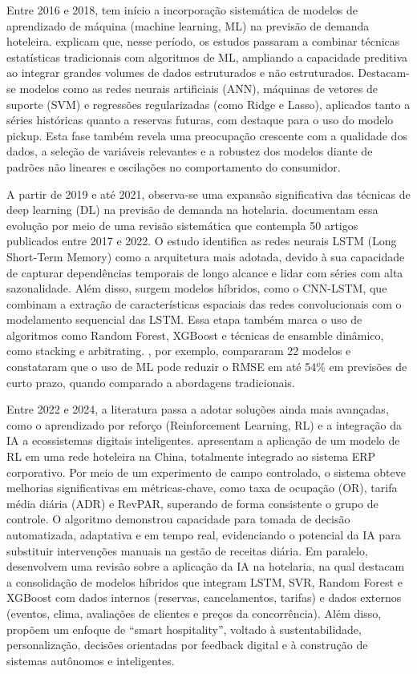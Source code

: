 Entre 2016 e 2018, tem início a incorporação sistemática de modelos de aprendizado de máquina (machine learning, ML) na previsão de demanda hoteleira. \citep{henriques2024hotel} explicam que, nesse período, os estudos passaram a combinar técnicas estatísticas tradicionais com algoritmos de ML, ampliando a capacidade preditiva ao integrar grandes volumes de dados estruturados e não estruturados. Destacam-se modelos como as redes neurais artificiais (ANN), máquinas de vetores de suporte (SVM) e regressões regularizadas (como Ridge e Lasso), aplicados tanto a séries históricas quanto a reservas futuras, com destaque para o uso do modelo pickup. Esta fase também revela uma preocupação crescente com a qualidade dos dados, a seleção de variáveis relevantes e a robustez dos modelos diante de padrões não lineares e oscilações no comportamento do consumidor.

A partir de 2019 e até 2021, observa-se uma expansão significativa das técnicas de deep learning (DL) na previsão de demanda na hotelaria. \citep{dowlut2023forecasting} documentam essa evolução por meio de uma revisão sistemática que contempla 50 artigos publicados entre 2017 e 2022. O estudo identifica as redes neurais LSTM (Long Short-Term Memory) como a arquitetura mais adotada, devido à sua capacidade de capturar dependências temporais de longo alcance e lidar com séries com alta sazonalidade. Além disso, surgem modelos híbridos, como o CNN-LSTM, que combinam a extração de características espaciais das redes convolucionais com o modelamento sequencial das LSTM. Essa etapa também marca o uso de algoritmos como Random Forest, XGBoost e técnicas de ensamble dinâmico, como stacking e arbitrating. \citep{Pereira02092022}, por exemplo, compararam 22 modelos e constataram que o uso de ML pode reduzir o RMSE em até 54\% em previsões de curto prazo, quando comparado a abordagens tradicionais.

Entre 2022 e 2024, a literatura passa a adotar soluções ainda mais avançadas, como o aprendizado por reforço (Reinforcement Learning, RL) e a integração da IA a ecossistemas digitais inteligentes. \citep{Chen2023} apresentam a aplicação de um modelo de RL em uma rede hoteleira na China, totalmente integrado ao sistema ERP corporativo. Por meio de um experimento de campo controlado, o sistema obteve melhorias significativas em métricas-chave, como taxa de ocupação (OR), tarifa média diária (ADR) e RevPAR, superando de forma consistente o grupo de controle. O algoritmo demonstrou capacidade para tomada de decisão automatizada, adaptativa e em tempo real, evidenciando o potencial da IA para substituir intervenções manuais na gestão de receitas diária. Em paralelo, \citep{henriques2024hotel} desenvolvem uma revisão sobre a aplicação da IA na hotelaria, na qual destacam a consolidação de modelos híbridos que integram LSTM, SVR, Random Forest e XGBoost com dados internos (reservas, cancelamentos, tarifas) e dados externos (eventos, clima, avaliações de clientes e preços da concorrência). Além disso, propõem um enfoque de “smart hospitality”, voltado à sustentabilidade, personalização, decisões orientadas por feedback digital e à construção de sistemas autônomos e inteligentes.

